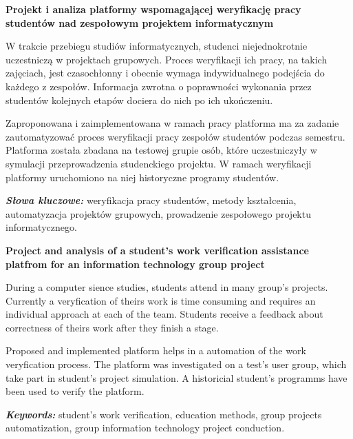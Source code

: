 \newpage
\vspace{10cm}

\newpage
\begin{center}
	\textbf{Projekt i analiza platformy wspomagającej weryfikację pracy studentów
nad zespołowym projektem informatycznym}
\end{center}

W trakcie przebiegu studiów informatycznych, studenci niejednokrotnie uczestniczą w projektach grupowych.
Proces weryfikacji ich pracy, na takich zajęciach, jest czasochłonny i obecnie wymaga indywidualnego podejścia do każdego z zespołów.
Informacja zwrotna o poprawności wykonania przez studentów kolejnych etapów dociera do nich po ich ukończeniu.

Zaproponowana i zaimplementowana w ramach pracy platforma ma za zadanie zautomatyzować proces weryfikacji pracy zespołów studentów podczas semestru. 
Platforma została zbadana na testowej grupie osób, które uczestniczyły w symulacji przeprowadzenia studenckiego projektu.
W ramach weryfikacji platformy uruchomiono na niej historyczne programy studentów.


\textit{\textbf{Słowa kluczowe:}} weryfikacja pracy studentów, metody kształcenia, automatyzacja projektów grupowych, prowadzenie zespołowego projektu informatycznego.

	\vspace{1cm}

\begin{center}
    \textbf{Project and analysis of a student's work verification assistance platfrom for an information technology group project}
\end{center}

During a computer sience studies, students attend in many group's projects.
Currently a veryfication of theirs work is time consuming and requires an individual approach at each of the team.
Students receive a feedback about correctness of theirs work after they finish a stage.

Proposed and implemented platform helps in a automation of the work veryfication process.
The platform was investigated on a test's user group, which take part in student's project simulation.
A historicial student's programms have been used to verify the platform.

\textit{\textbf{Keywords:}} student's work verification, education methods, group projects automatization, group information technology project conduction.

\cleardoublepage
